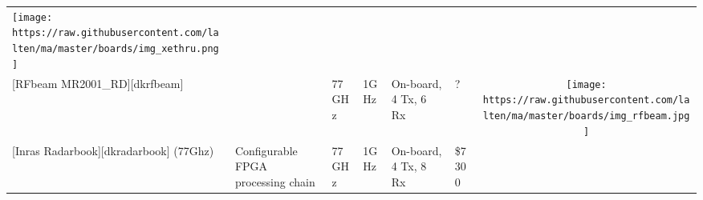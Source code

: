 \begin{longtable}[]{@{}llllllc@{}}
\begin{minipage}[t]{0.10\columnwidth}
\texttt{[image: https://raw.githubusercontent.com/lalten/ma/master/boards/img\_xethru.png]}\strut
\end{minipage}\tabularnewline
\begin{minipage}[t]{0.09\columnwidth}\raggedright\strut
{[}RFbeam MR2001\_RD{]}{[}dkrfbeam{]}\strut
\end{minipage} & \begin{minipage}[t]{0.13\columnwidth}\raggedright\strut
\strut
\end{minipage} & \begin{minipage}[t]{0.09\columnwidth}\raggedright\strut
77GHz\strut
\end{minipage} & \begin{minipage}[t]{0.11\columnwidth}\raggedright\strut
1GHz\strut
\end{minipage} & \begin{minipage}[t]{0.10\columnwidth}\raggedright\strut
On-board, 4 Tx, 6 Rx\strut
\end{minipage} & \begin{minipage}[t]{0.15\columnwidth}\raggedright\strut
?\strut
\end{minipage} & \begin{minipage}[t]{0.10\columnwidth}\centering\strut
\texttt{[image: https://raw.githubusercontent.com/lalten/ma/master/boards/img\_rfbeam.jpg]}\strut
\end{minipage}\tabularnewline
\begin{minipage}[t]{0.09\columnwidth}\raggedright\strut
{[}Inras Radarbook{]}{[}dkradarbook{]} (77Ghz)\strut
\end{minipage} & \begin{minipage}[t]{0.13\columnwidth}\raggedright\strut
Configurable FPGA processing chain\strut
\end{minipage} & \begin{minipage}[t]{0.09\columnwidth}\raggedright\strut
77GHz\strut
\end{minipage} & \begin{minipage}[t]{0.11\columnwidth}\raggedright\strut
1GHz\strut
\end{minipage} & \begin{minipage}[t]{0.10\columnwidth}\raggedright\strut
On-board, 4 Tx, 8 Rx\strut
\end{minipage} & \begin{minipage}[t]{0.15\columnwidth}\raggedright\strut
\$7300\strut
\end{minipage} & \begin{minipage}[t]{0.10\columnwidth}\centering\strut

\end{minipage}
\end{longtable}

